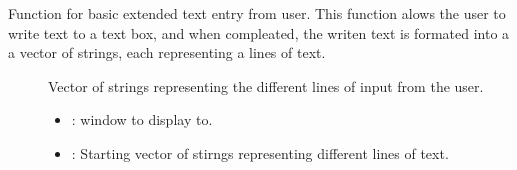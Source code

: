 \documentclass[letterpaper,10pt,english]{sphinxmanual}
\begin{document}
\begin{fulllineitems}
\begin{fulllineitems}
\label{\detokenize{index:_CPPv2N7ostendo8VTextBoxEN7ostendo6WindowENSt6vectorINSt6stringEEE}}%
\pysigstartmultiline
{}\label{\detokenize{index:Pessumnamespaceostendo_1ac2ce30296ad60b1e02258e3d5c1e8b4f}}%
\pysigstopmultiline
Function for basic extended text entry from user. This function alows the user to write text to a text box, and when compleated, the writen text is formated into a a vector of strings, each representing a lines of text. \begin{description}
\item[{}] \leavevmode
Vector of strings representing the different lines of input from the user. 

\item[{}] \leavevmode
{\hyperref[\detokenize{index:Pessumclassostendo_1_1Window}]{}} 

\item[{}] \leavevmode\begin{itemize}
\item {} 
: window to display to. 

\item {} 
: Starting vector of stirngs representing different lines of text. 

\end{itemize}

\end{description}


\end{fulllineitems}



\end{fulllineitems}
\end{document}
